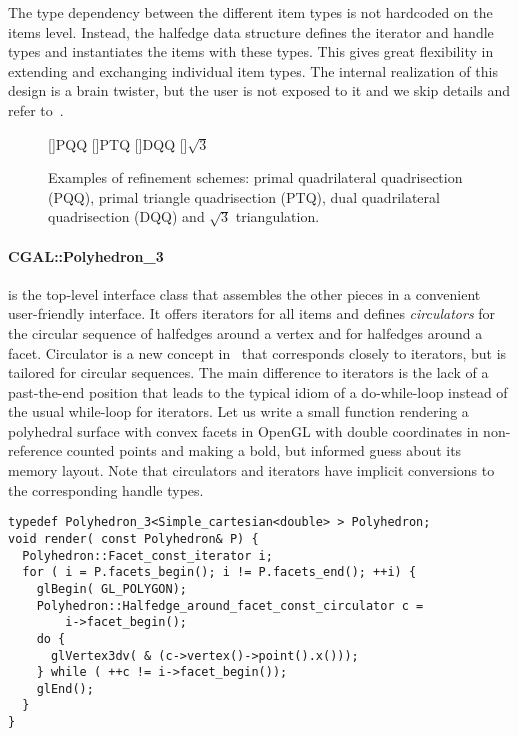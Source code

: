 The type dependency between the different item types is not hardcoded
on the items level. Instead, the halfedge data structure defines the
iterator and handle types and instantiates the items with these types.
This gives great flexibility in extending and exchanging individual
item types. The internal realization of this design is a brain
twister, but the user is not exposed to it and we skip details and refer
to~\cite{k-ugpdd-99}.

\begin{figure}[tb]
  \centering
  []{\scriptsize PQQ} 
  []{\scriptsize PTQ}
  []{\scriptsize DQQ} 
  []{\scriptsize $\sqrt{3}$} 
  \caption{Examples of refinement schemes: 
    primal quadrilateral quadrisection (PQQ),
    primal triangle quadrisection (PTQ),
    dual quadrilateral quadrisection (DQQ) and
    $\sqrt{3}$ triangulation.}
  \label{fig:RefSchemes}\vspace*{-4mm}
\end{figure}



\paragraph*{CGAL::Polyhedron\_3} is the top-level interface class that
assembles the other pieces in a convenient user-friendly interface.
It offers iterators for all items and defines \emph{circulators} for
the circular sequence of halfedges around a vertex and for halfedges
around a facet. Circulator is a new concept in \cgal\ that
corresponds closely to iterators, but is tailored for circular
sequences.  The main difference to iterators is the lack of a
past-the-end position that leads to the typical idiom of a
do-while-loop instead of the usual while-loop for iterators.  Let us
write a small function rendering a polyhedral surface with convex
facets in OpenGL with double coordinates in non-reference counted
points and making a bold, but informed guess about its memory layout.
Note that circulators and iterators have implicit conversions to the
corresponding handle types.

\begin{lstlisting}
typedef Polyhedron_3<Simple_cartesian<double> > Polyhedron;
void render( const Polyhedron& P) {
  Polyhedron::Facet_const_iterator i;
  for ( i = P.facets_begin(); i != P.facets_end(); ++i) {
    glBegin( GL_POLYGON);
    Polyhedron::Halfedge_around_facet_const_circulator c = 
        i->facet_begin();
    do {
      glVertex3dv( & (c->vertex()->point().x()));
    } while ( ++c != i->facet_begin());
    glEnd();
  }
}
\end{lstlisting}%
\vspace*{-3.5mm}

